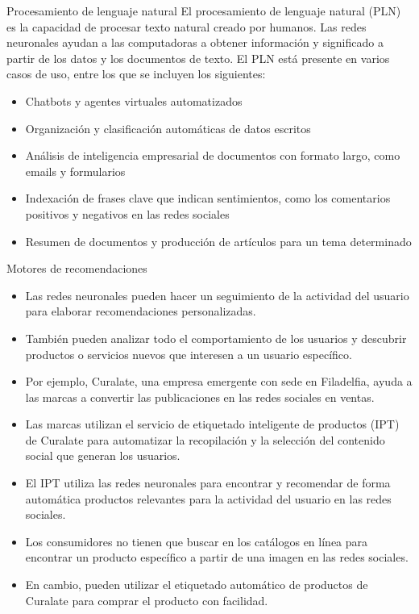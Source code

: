 \documentclass[11pt,aspectratio=169]{beamer}
\begin{document}
\begin{frame}{Procesamiento de lenguaje natural}
	El procesamiento de lenguaje natural (PLN) es la capacidad de procesar texto natural creado por humanos.\pause
	Las redes neuronales ayudan a las computadoras a obtener información y significado a partir de los datos y los documentos de texto.\pause
	El PLN está presente en varios casos de uso, entre los que se incluyen los siguientes:\pause
	\begin{itemize}
		\item Chatbots y agentes virtuales automatizados \pause
		\item Organización y clasificación automáticas de datos escritos\pause 
		\item Análisis de inteligencia empresarial de documentos con formato largo, como emails y formularios\pause 
		\item Indexación de frases clave que indican sentimientos, como los comentarios positivos y negativos en las redes sociales\pause
		\item Resumen de documentos y producción de artículos para un tema determinado
	\end{itemize}
\end{frame}

\begin{frame}{Motores de recomendaciones}
	\begin{itemize}
		\item Las redes neuronales pueden hacer un seguimiento de la actividad del usuario para elaborar recomendaciones personalizadas.\pause
		\item También pueden analizar todo el comportamiento de los usuarios y descubrir productos o servicios nuevos que interesen a un 
			usuario específico.\pause
		\item Por ejemplo, Curalate, una empresa emergente con sede en Filadelfia, ayuda a las marcas a convertir las publicaciones en las 
			redes sociales en ventas.\pause 
		\item Las marcas utilizan el servicio de etiquetado inteligente de productos (IPT) de Curalate para automatizar la recopilación y 
			la selección del contenido social que generan los usuarios.\pause
		\item El IPT utiliza las redes neuronales para encontrar y recomendar de forma automática productos relevantes para la actividad 
			del usuario en las redes sociales.\pause 
		\item Los consumidores no tienen que buscar en los catálogos en línea para encontrar un producto específico a partir de una imagen 
			en las redes sociales.\pause  
		\item En cambio, pueden utilizar el etiquetado automático de productos de Curalate para comprar el producto con facilidad.
	\end{itemize}
\end{frame}
\end{document}
